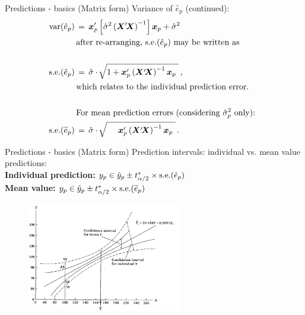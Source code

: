 \documentclass{beamer}
\begin{document}
\begin{frame}{Predictions - basics (Matrix form)}
Variance of $\hat{e}_p$ (continued):
\begin{equation*}
\begin{aligned}
\textnormal{var}(\hat{e}_p) \,&=\,
\bm{x}_{p}^\prime \left[ \hat{\sigma}^2 \left( \bm{X}^\prime \! \bm{X}  \right)^{-1} \right] \bm{x}_{p}
   + \hat{\sigma}^2\\
   & \textnormal{after re-arranging, $\textnormal{s.e.}(\hat{e}_p)$ may be written as}\\
   &~\\
   \textnormal{s.e.}(\hat{e}_p) \,&=\, \hat{\sigma} \cdot \,  
   \sqrt[]{1+ \bm{x}_{p}^\prime \left( \bm{X}^\prime \! \bm{X}  \right)^{-1} \bm{x}_{p}~} \,,\\
   &\textnormal{which relates to the individual prediction error. }\\~&~\\
   &\textnormal{For mean prediction errors (considering $\hat{\sigma}_p^2$ only): }\\
   \textnormal{s.e.}(\widetilde{e}_p) \,&=\, \hat{\sigma} \cdot \,  
   \sqrt[]{~~~~ \bm{x}_{p}^\prime \left( \bm{X}^\prime \! \bm{X}  \right)^{-1} \bm{x}_{p}~} \,.\\
\end{aligned}
\end{equation*}

\end{frame}

\begin{frame}{Predictions - basics (Matrix form)}
Prediction intervals: individual vs. mean value predictions:\\
\vspace{0.3cm}
\textbf{Individual prediction:} $y_p \in \hat{y}_p \pm t^*_{\alpha/2} \times \textnormal{s.e.}(\hat{e}_p)$\\
\vspace{0.3cm}
\textbf{Mean value:} \hspace{1.7cm} $y_p \in \hat{y}_p \pm t^*_{\alpha/2} \times \textnormal{s.e.}(\widetilde{e}_p)$

\begin{figure}
\includegraphics[width=0.6\textwidth]{img/P3_PredError.jpg}
\end{figure}

\end{frame}
\end{document}
